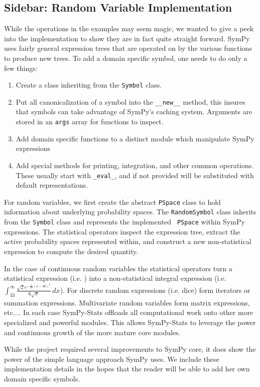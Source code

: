 \subsection{Sidebar: Random Variable Implementation}

While the operations in the examples may seem magic, we wanted to give a peek
into the implementation to show they are in fact quite straight forward. SymPy
uses fairly general expression trees that are operated on by the various
functions to produce new trees.  To add a domain specific symbol, one needs to
do only a few things:

\begin{enumerate}
\item Create a class inheriting from the {\tt Symbol} class. 
\item Put all canonicalization of a symbol into the {\tt \_\_new\_\_} method, this
  insures that symbols can take advantage of SymPy's caching system.  Arguments
  are stored in an {\tt args} array for functions to inspect.
\item Add domain specific functions to a distinct module which manipulate SymPy expressions
\item Add special methods for printing, integration, and other common
  operations.  These usually start with {\tt \_eval\_}, and if not provided will
  be substituted with default representations.
\end{enumerate}

For random variables, we first create the abstract {\tt PSpace} class to hold
information about underlying probability spaces.  The {\tt RandomSymbol}
class inherits from the {\tt Symbol} class and represents the implemented {\tt
  PSpace} within SymPy expressions. 
The statistical operators  inspect the expression tree, extract the active probability spaces represented within, and construct a new non-statistical expression to compute the desired quantity. 

In the case of continuous random variables the statistical operators turn a statistical expression (i.e. ) into a non-statistical integral expression (i.e. $\int_{33}^{\infty} \frac{\sqrt{2} e^{- \frac{1}{18} \left(x -30\right)^{2}}}{6 \sqrt{\pi}}\, dx $). For discrete random expressions (i.e. dice) form iterators or summation expressions. Multivariate random variables form matrix expressions, etc....
In each case SymPy-Stats offloads all computational work onto other more specialized and powerful modules. This allows SymPy-Stats to leverage the power and continuous growth of the more mature core modules.

While the project required several improvements to SymPy core, it does show the
power of the simple language approach SymPy uses.  We include these
implementation details in the hopes that the reader will be able to add her own
domain specific symbols.
